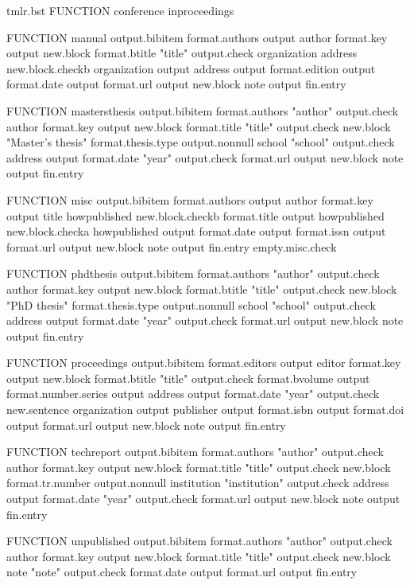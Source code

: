 \begin{filecontents*}[overwrite]{tmlr.bst}
FUNCTION {conference} { inproceedings }

FUNCTION {manual}
{ output.bibitem
  format.authors output
  author format.key output
  new.block
  format.btitle "title" output.check
  organization address new.block.checkb
  organization output
  address output
  format.edition output
  format.date output
  format.url output
  new.block
  note output
  fin.entry
}

FUNCTION {mastersthesis}
{ output.bibitem
  format.authors "author" output.check
  author format.key output
  new.block
  format.title "title" output.check
  new.block
  "Master's thesis" format.thesis.type output.nonnull
  school "school" output.check
  address output
  format.date "year" output.check
  format.url output
  new.block
  note output
  fin.entry
}

FUNCTION {misc}
{ output.bibitem
  format.authors output
  author format.key output
  title howpublished new.block.checkb
  format.title output
  howpublished new.block.checka
  howpublished output
  format.date output
  format.issn output
  format.url output
  new.block
  note output
  fin.entry
  empty.misc.check
}

FUNCTION {phdthesis}
{ output.bibitem
  format.authors "author" output.check
  author format.key output
  new.block
  format.btitle "title" output.check
  new.block
  "PhD thesis" format.thesis.type output.nonnull
  school "school" output.check
  address output
  format.date "year" output.check
  format.url output
  new.block
  note output
  fin.entry
}

FUNCTION {proceedings}
{ output.bibitem
  format.editors output
  editor format.key output
  new.block
  format.btitle "title" output.check
  format.bvolume output
  format.number.series output
  address output
  format.date "year" output.check
  new.sentence
  organization output
  publisher output
  format.isbn output
  format.doi output
  format.url output
  new.block
  note output
  fin.entry
}

FUNCTION {techreport}
{ output.bibitem
  format.authors "author" output.check
  author format.key output
  new.block
  format.title "title" output.check
  new.block
  format.tr.number output.nonnull
  institution "institution" output.check
  address output
  format.date "year" output.check
  format.url output
  new.block
  note output
  fin.entry
}

FUNCTION {unpublished}
{ output.bibitem
  format.authors "author" output.check
  author format.key output
  new.block
  format.title "title" output.check
  new.block
  note "note" output.check
  format.date output
  format.url output
  fin.entry
}


\end{filecontents*}
